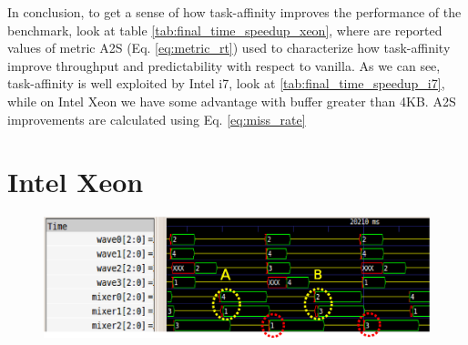 
In conclusion, to get a sense of how task-affinity improves the performance of the benchmark, look at table \ref{tab:final_time_speedup_xeon}, where are 
reported values of metric A2S (Eq. \ref{eq:metric_rt}) used to characterize how task-affinity improve throughput and predictability with respect to vanilla.
As we can see, task-affinity is well exploited by Intel i7, look at \ref{tab:final_time_speedup_i7}, while on Intel Xeon we have some advantage with buffer 
greater than 4KB. A2S improvements are calculated using Eq. \ref{eq:miss_rate} 

\section{Intel Xeon}

\begin{figure}[htbp]
\centering
\includegraphics[width=\widefigure]{images/results_xeon/final_xeon.eps}
\caption{}
\label{fig:final_xeon}
\end{figure}

